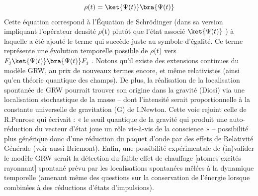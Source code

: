 \[
\rho(t)=\ket{\Psi(t)}\bra{\Psi(t)}
\]
Cette équation correspond à l’Équation de Schrödinger (dans sa version impliquant
l’opérateur densité $\rho$(t) plutôt que l’état associé $\ket{\Psi(t)}$ ) à laquelle a été
 ajouté le terme qui
succède juste au symbole d’égalité. Ce terme représente une évolution temporelle possible
de $\rho$(t) vers $F_j\ket{\Psi(t)}\bra{\Psi(t)}F_j$ . Notons qu’il existe des extensions
 continues du modèle
GRW, au prix de nouveaux termes encore, et même relativistes (ainsi qu’en théorie
quantique des champs). De plus, la réalisation de la localisation spontanée de GRW pourrait
trouver son origine dans la gravité (Diosi) via une localisation stochastique de la masse –
dont l’intensité serait proportionnelle à la constante universelle de gravitation (G) de
I.Newton. Cette voie rejoint celle de R.Penrose qui écrivait : « le seuil quantique de la
gravité qui produit une auto-réduction du vecteur d’état joue un rôle vis-à-vis de la
conscience » – possibilité plus générique donc d’une réduction du paquet d’onde par des
effets de Relativité Générale (voir aussi Bricmont). Enfin, une possibilité expérimentale de
(in)valider le modèle GRW serait la détection du faible effet de chauffage [atomes excités
rayonnant] spontané prévu par les localisations spontanées mêlées à la dynamique
temporelle (amenant même des questions sur la conservation de l’énergie lorsque combinées
à des réductions d’états d’impulsions).
